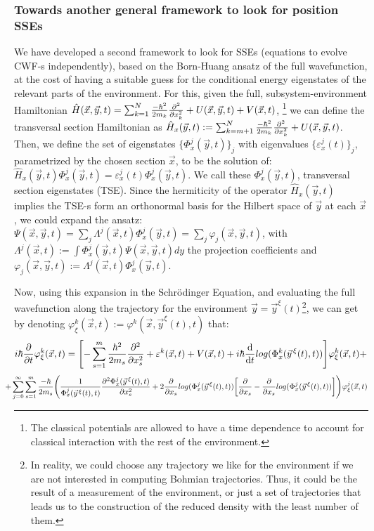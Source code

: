 \documentclass[11pt, a4paper]{article} %
\begin{document}
\subsubsection*{Towards another general framework to look for position SSEs}
We have developed a second framework to look for SSEs (equations to evolve CWF-s independently), based on the Born-Huang ansatz of the full wavefunction, at the cost of having a suitable guess for the conditional energy eigenstates of the relevant parts of the environment. For this, given the full, subsystem-environment Hamiltonian $\hat{H}(\vec{x},\vec{y},t)=\sum_{k=1}^N \frac{-\hbar^2}{2m_k}\pdv[2]{}{x_k} + U(\vec{x},\vec{y},t)+V(\vec{x},t)$, \footnote{The classical potentials are allowed to have a time dependence to account for classical interaction with the rest of the environment.} we can define the transversal section Hamiltonian as $\hat{H}_x(\vec{y},t):=\sum_{k=m+1}^N\frac{-\hbar^2}{2m_k}\pdv[2]{}{x_k}+U(\vec{x},\vec{y},t)$. Then, we define the set of eigenstates $\{\Phi^j_x(\vec{y},t)\}_j$ with eigenvalues $\{\varepsilon_x^j(t)\}_j$, parametrized by the chosen section $\vec{x}$, to be the solution of: $\hat{H}_x(\vec{y},t)\Phi^j_x(\vec{y},t)=\varepsilon_x^j(t)\Phi^j_x(\vec{y},t)$. We call these $\Phi^j_x(\vec{y},t)$, transversal section eigenstates (TSE). Since the hermiticity of the operator $\hat{H}_x(\vec{y},t)$ implies the TSE-s form an orthonormal basis for the Hilbert space of $\vec{y}$ at each $\vec{x}$, we could expand the ansatz: $\Psi(\vec{x},\vec{y},t)=\sum_j \Lambda^j(\vec{x},t)\Phi_x^j(\vec{y},t)=\sum_j \varphi_j(\vec{x},\vec{y},t)$, with $\Lambda^j(\vec{x},t):=\int\Phi^j_x(\vec{y},t)\Psi(\vec{x},\vec{y},t)dy$ the projection coefficients and $\varphi_j(\vec{x},\vec{y},t):=\Lambda^j(\vec{x},t)\Phi^j_x(\vec{y},t)$.

Now, using this expansion in the Schrödinger Equation, and evaluating the full wavefunction along the trajectory for the environment $\vec{y}=\vec{y}^\xi(t)$\footnote{In reality, we could choose any trajectory we like for the environment if we are not interested in computing Bohmian trajectories. Thus, it could be the result of a measurement of the environment, or just a set of trajectories that leads us to the construction of the reduced density with the least number of them.}, we can get by denoting $\varphi^k_\xi(\vec{x},t):=\varphi^k(\vec{x},\vec{y}^\xi(t),t)$ that:
\begin{equation}
 i\hbar\pdv{}{t}\varphi^k_\xi(\vec{x},t)=\qty[-\sum_{s=1}^m\frac{\hbar^2}{2m_s}\pdv[2]{}{x_s}+ \varepsilon^k(\vec{x},t)+V(\vec{x},t)   +i\hbar \dv{}{t}log(\Phi^k_x(\vec{y}^{\, \xi}(t),t))]\varphi^k_\xi(\vec{x},t)+
\end{equation}
$$
\hspace{-0.4cm}+\sum_{j=0}^\infty\sum_{s=1}^m \frac{-\hbar}{2m_s}\qty( \frac{1}{\Phi^j_x(\vec{y}^{\, \xi}(t),t)}\pdv[2]{\Phi^j_x(\vec{y}^{\, \xi}(t),t)}{x_s}+2\pdv{}{x_s}log(\Phi^j_x(\vec{y}^{\, \xi}(t),t))\qty[\pdv{}{x_s}-\pdv{}{x_s}log(\Phi^j_x(\vec{y}^{\, \xi}(t),t))] )\varphi^j_\xi(\vec{x},t)
$$
\end{document}
